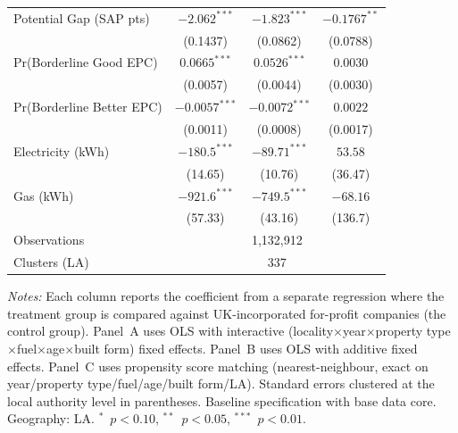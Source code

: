 \begin{table}[htbp]
\begin{tabular}{l ccc}
Potential Gap (SAP pts) & $-2.062^{***}$ & $-1.823^{***}$ & $-0.1767^{**}$ \\
 & (0.1437) & (0.0862) & (0.0788) \\
Pr(Borderline Good EPC) & $0.0665^{***}$ & $0.0526^{***}$ & $0.0030$ \\
 & (0.0057) & (0.0044) & (0.0030) \\
Pr(Borderline Better EPC) & $-0.0057^{***}$ & $-0.0072^{***}$ & $0.0022$ \\
 & (0.0011) & (0.0008) & (0.0017) \\
Electricity (kWh) & $-180.5^{***}$ & $-89.71^{***}$ & $53.58$ \\
 & (14.65) & (10.76) & (36.47) \\
Gas (kWh) & $-921.6^{***}$ & $-749.5^{***}$ & $-68.16$ \\
 & (57.33) & (43.16) & (136.7) \\
\midrule
Observations & \multicolumn{3}{c}{1,132,912} \\
Clusters (LA) & \multicolumn{3}{c}{337} \\
\bottomrule
\end{tabular}
\begin{minipage}{\textwidth}
\vspace{0.3em}
\footnotesize
\textit{Notes:} Each column reports the coefficient from a separate regression where the treatment group is compared against UK-incorporated for-profit companies (the control group). Panel~A uses OLS with interactive (locality$\times$year$\times$property type$\times$fuel$\times$age$\times$built form) fixed effects. Panel~B uses OLS with additive fixed effects. Panel~C uses propensity score matching (nearest-neighbour, exact on year/property type/fuel/age/built form/LA). Standard errors clustered at the local authority level in parentheses. Baseline specification with base data core. Geography: LA. $^{*}$~$p<0.10$, $^{**}$~$p<0.05$, $^{***}$~$p<0.01$.
\end{minipage}
\end{table}
